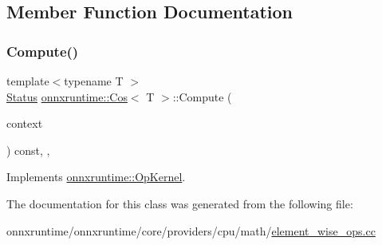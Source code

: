 \subsection{Member Function Documentation}
\mbox{\label{classonnxruntime_1_1Cos_a363b9858a98d347c29935c6aa70644bb}} 
\subsubsection{\texorpdfstring{Compute()}{Compute()}}
{\footnotesize\ttfamily template$<$typename T $>$ \\
\mbox{\hyperlink{classonnxruntime_1_1common_1_1Status}{Status}} \mbox{\hyperlink{classonnxruntime_1_1Cos}{onnxruntime\+::\+Cos}}$<$ T $>$\+::Compute (\begin{DoxyParamCaption}\item[{\mbox{\hyperlink{classonnxruntime_1_1OpKernelContext}{Op\+Kernel\+Context}} $\ast$}]{context }\end{DoxyParamCaption}) const\hspace{0.3cm}{\ttfamily [inline]}, {\ttfamily [override]}, {\ttfamily [virtual]}}



Implements \mbox{\hyperlink{classonnxruntime_1_1OpKernel_a9eca8656a78b1b3ab9d3351a12798650}{onnxruntime\+::\+Op\+Kernel}}.



The documentation for this class was generated from the following file\+:\begin{DoxyCompactItemize}
\item 
onnxruntime/onnxruntime/core/providers/cpu/math/\mbox{\hyperlink{element__wise__ops_8cc}{element\+\_\+wise\+\_\+ops.\+cc}}\end{DoxyCompactItemize}
